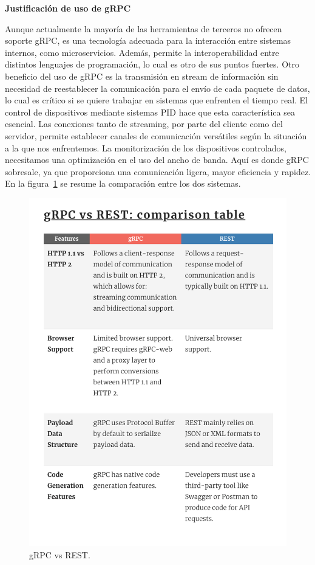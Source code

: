 \textbf{Justificación de uso de gRPC}

Aunque actualmente la mayoría de las herramientas de terceros no ofrecen soporte gRPC, es una tecnología adecuada para la interacción entre sistemas internos, como microservicios. Además, permite la interoperabilidad entre distintos lenguajes de programación, lo cual es otro de sus puntos fuertes. Otro beneficio del uso de gRPC es la transmisión en stream de información sin necesidad de reestablecer la comunicación para el envío de cada paquete de datos, lo cual es crítico si se quiere trabajar en sistemas que enfrenten el tiempo real. El control de dispositivos mediante sistemas PID hace que esta característica sea esencial. Las conexiones tanto de streaming, por parte del cliente como del servidor, permite establecer canales de comunicación versátiles según la situación a la que nos enfrentemos. La monitorización de los dispositivos controlados, necesitamos una optimización en el uso del ancho de banda. Aquí es donde gRPC sobresale, ya que proporciona una comunicación ligera, mayor eficiencia y rapidez. En la figura~\cref{fig:gRPC vs REST} se resume la comparación entre los dos sistemas.

\begin{figure}[H]
    \centering
    \includegraphics[height=0.4\textheight]{./part/Proyecto_ejecutivo/memoria_constructiva/rpc/img/rpcComparison}
    \caption{gRPC vs REST.\cite{berga_santos_2023}}\label{fig:gRPC vs REST}
\end{figure}